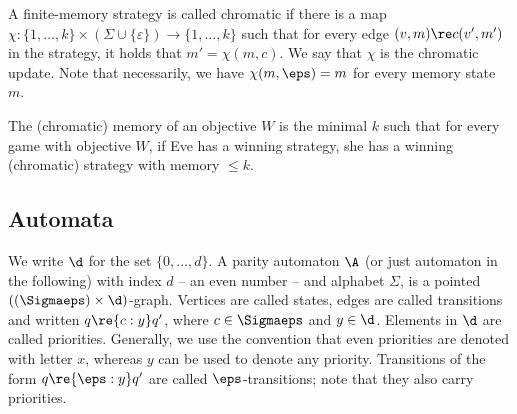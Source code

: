 A finite-memory strategy is called chromatic if there is a map $\chi:\{1,\dots,k\} \times (\Sigma \cup \{\varepsilon\}) \to \{1,\dots,k\}$ such that for every edge $(v,m) \re c (v',m')$ in the strategy, it holds that $m'=\chi(m,c)$.
We say that $\chi$ is the chromatic update.
Note that necessarily, we have $\chi(m,\eps)=m$ for every memory state $m$.

The (chromatic) memory of an objective $W$ is the minimal $k$ such that for every game with objective $W$, if Eve has a winning strategy, she has a winning (chromatic) strategy with memory $\leq k$.


\subsection{Automata}

We write $\d$ for the set $\{0,\dots,d\}$.
A parity automaton $\A$ (or just automaton in the following) with index $d$ -- an even number -- and alphabet $\Sigma$, is a pointed $((\Sigmaeps) \times \d)$-graph.
Vertices are called states, edges are called transitions and written $q \re{c:y} q'$, where $c \in \Sigmaeps$ and $y \in \d$.
Elements in $\d$ are called priorities.
Generally, we use the convention that even priorities are denoted with letter $x$, whereas $y$ can be used to denote any priority.
Transitions of the form $q \re{\eps:y} q'$ are called $\eps$-transitions; note that they also carry priorities.

